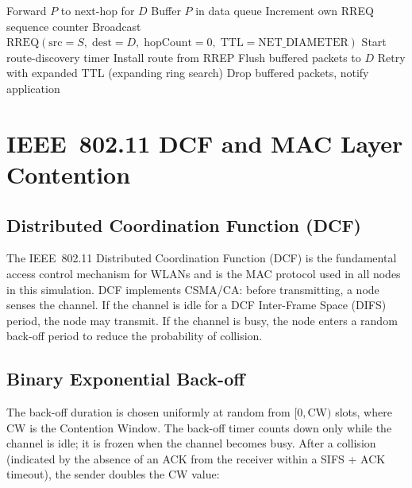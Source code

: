 \begin{algorithm}[ht]
\caption{AODV Route Discovery at Source Node}
\begin{algorithmic}[1]
    \State Forward $P$ to next-hop for $D$
  \Else
    \State Buffer $P$ in data queue
    \State Increment own RREQ sequence counter
    \State Broadcast $\text{RREQ}(\text{src}=S,\; \text{dest}=D,\; \text{hopCount}=0,\; \text{TTL}=\text{NET\_DIAMETER})$
    \State Start route-discovery timer
      \State Install route from RREP
      \State Flush buffered packets to $D$
    \Else
      \State Retry with expanded TTL (expanding ring search)
        \State Drop buffered packets, notify application
      \EndIf
    \EndIf
  \EndIf
\EndProcedure
\end{algorithmic}
\end{algorithm}

\section{IEEE~802.11 DCF and MAC Layer Contention}

\subsection{Distributed Coordination Function (DCF)}

The IEEE~802.11 Distributed Coordination Function (DCF) is the fundamental access
control mechanism for WLANs and is the MAC protocol used in all nodes in this
simulation. DCF implements CSMA/CA: before transmitting, a node senses the channel.
If the channel is idle for a DCF Inter-Frame Space (DIFS) period, the node may
transmit. If the channel is busy, the node enters a random back-off period to reduce
the probability of collision.

\subsection{Binary Exponential Back-off}

The back-off duration is chosen uniformly at random from $[0, \text{CW})$ slots, where
CW is the Contention Window. The back-off timer counts down only while the channel is
idle; it is frozen when the channel becomes busy. After a collision (indicated by the
absence of an ACK from the receiver within a SIFS + ACK timeout), the sender doubles
the CW value:

